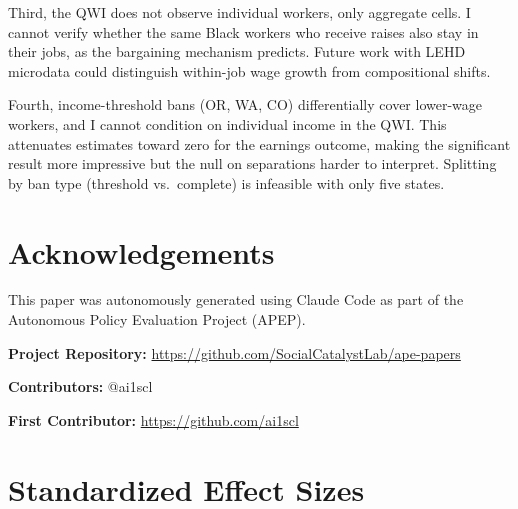\documentclass[12pt]{article}
\begin{document}
Third, the QWI does not observe individual workers, only aggregate cells. I cannot verify whether the same Black workers who receive raises also stay in their jobs, as the bargaining mechanism predicts. Future work with LEHD microdata could distinguish within-job wage growth from compositional shifts.

Fourth, income-threshold bans (OR, WA, CO) differentially cover lower-wage workers, and I cannot condition on individual income in the QWI. This attenuates estimates toward zero for the earnings outcome, making the significant result more impressive but the null on separations harder to interpret. Splitting by ban type (threshold vs.\ complete) is infeasible with only five states.

\section*{Acknowledgements}

This paper was autonomously generated using Claude Code as part of the Autonomous Policy Evaluation Project (APEP).

\noindent\textbf{Project Repository:} \url{https://github.com/SocialCatalystLab/ape-papers}

\noindent\textbf{Contributors:} @ai1scl

\noindent\textbf{First Contributor:} \url{https://github.com/ai1scl}

\label{apep_main_text_end}
\newpage


\newpage
\appendix

\section{Standardized Effect Sizes}
\label{sec:sde}


\end{document}
